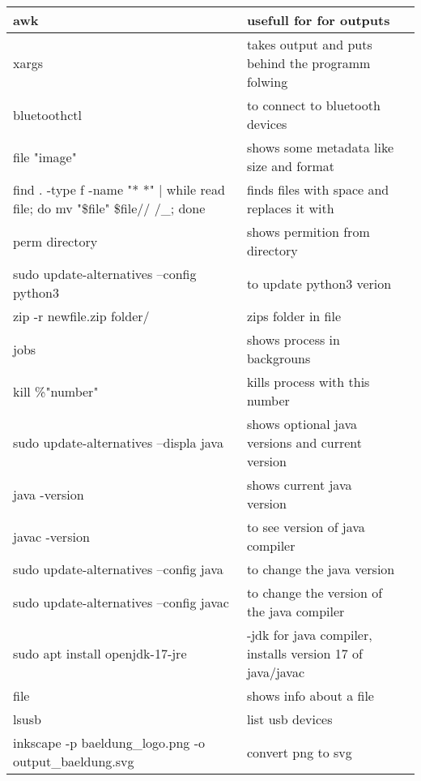 \documentclass[12pt]{article}
\begin{document}
\begin{tabular}{| p{6.5cm} | p{6.5cm} | p{6.5cm} |}
    \hline
    awk & usefull for for outputs &\\
    \hline 
    xargs & takes output and puts behind the programm folwing &\\
    \hline
    bluetoothctl & to connect to bluetooth devices &\\
    \hline
    file "image" & shows some metadata like size and format &\\
    \hline
    find . -type f -name "* *" | while read file; do mv "\$file" \${file// /\_}; done & finds files with space and replaces it with &\\
    \hline
    perm directory & shows permition from directory &\\
    \hline
    sudo update-alternatives --config python3 & to update python3 verion & \\
    \hline 
    zip -r newfile.zip folder/ & zips folder in file & \\
    \hline
    jobs & shows process in backgrouns & \\
    \hline 
    kill \%"number" & kills process with this number & \\
    \hline
    sudo update-alternatives --displa java & shows optional java versions and current version & \\
    \hline 
    java -version & shows current java version & \\
    \hline
    javac -version & to see version of java compiler & \\
    \hline 
   sudo update-alternatives --config java & to change the java version & \\
    \hline
    sudo update-alternatives --config javac & to change the version of the java compiler & \\
    \hline
    sudo apt install openjdk-17-jre & -jdk for java compiler, installs version 17 of java/javac & \\
    \hline 
    file & shows info about a file & \\
    \hline
    lsusb & list usb devices & \\
    \hline
    inkscape -p baeldung\_logo.png -o output\_baeldung.svg  & convert png to svg \\
    \hline 
\end{tabular}

\newpage
\end{document}
